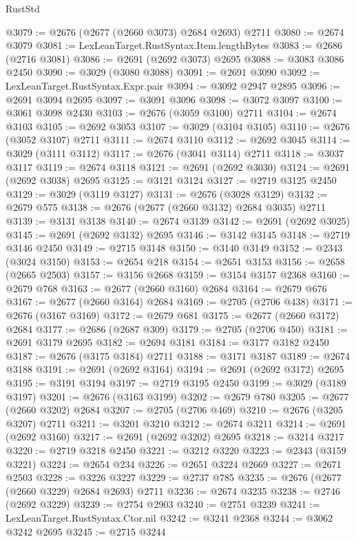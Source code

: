 \begin{lexlean}{RustStd}
\begin{coremodule}
@3079 := @2676 (@2677 (@2660 @3073) @2684 @2693) @2711
@3080 := @2674 @3079
@3081 := LexLeanTarget.RustSyntax.Item.lengthBytes
@3083 := @2686 (@2716 @3081)
@3086 := @2691 (@2692 @3073) @2695
@3088 := @3083 @3086 @2450
@3090 := @3029 (@3080 @3088)
@3091 := @2691 @3090
@3092 := LexLeanTarget.RustSyntax.Expr.pair
@3094 := @3092 @2947 @2895
@3096 := @2691 @3094 @2695
@3097 := @3091 @3096
@3098 := @3072 @3097
@3100 := @3061 @3098 @2430
@3103 := @2676 (@3059 @3100) @2711
@3104 := @2674 @3103
@3105 := @2692 @3053
@3107 := @3029 (@3104 @3105)
@3110 := @2676 (@3052 @3107) @2711
@3111 := @2674 @3110
@3112 := @2692 @3045
@3114 := @3029 (@3111 @3112)
@3117 := @2676 (@3041 @3114) @2711
@3118 := @3037 @3117
@3119 := @2674 @3118
@3121 := @2691 (@2692 @3030)
@3124 := @2691 (@2692 @3038) @2695
@3125 := @3121 @3124
@3127 := @2719 @3125 @2450
@3129 := @3029 (@3119 @3127)
@3131 := @2676 (@3028 @3129)
@3132 := @2679 @575
@3138 := @2676 (@2677 (@2660 @3132) @2684 @3035) @2711
@3139 := @3131 @3138
@3140 := @2674 @3139
@3142 := @2691 (@2692 @3025)
@3145 := @2691 (@2692 @3132) @2695
@3146 := @3142 @3145
@3148 := @2719 @3146 @2450
@3149 := @2715 @3148
@3150 := @3140 @3149
@3152 := @2343 (@3024 @3150)
@3153 := @2654 @218
@3154 := @2651 @3153
@3156 := @2658 (@2665 @2503)
@3157 := @3156 @2668
@3159 := @3154 @3157 @2368
@3160 := @2679 @768
@3163 := @2677 (@2660 @3160) @2684
@3164 := @2679 @676
@3167 := @2677 (@2660 @3164) @2684
@3169 := @2705 (@2706 @438)
@3171 := @2676 (@3167 @3169)
@3172 := @2679 @681
@3175 := @2677 (@2660 @3172) @2684
@3177 := @2686 (@2687 @309)
@3179 := @2705 (@2706 @450)
@3181 := @2691 @3179 @2695
@3182 := @2694 @3181
@3184 := @3177 @3182 @2450
@3187 := @2676 (@3175 @3184) @2711
@3188 := @3171 @3187
@3189 := @2674 @3188
@3191 := @2691 (@2692 @3164)
@3194 := @2691 (@2692 @3172) @2695
@3195 := @3191 @3194
@3197 := @2719 @3195 @2450
@3199 := @3029 (@3189 @3197)
@3201 := @2676 (@3163 @3199)
@3202 := @2679 @780
@3205 := @2677 (@2660 @3202) @2684
@3207 := @2705 (@2706 @469)
@3210 := @2676 (@3205 @3207) @2711
@3211 := @3201 @3210
@3212 := @2674 @3211
@3214 := @2691 (@2692 @3160)
@3217 := @2691 (@2692 @3202) @2695
@3218 := @3214 @3217
@3220 := @2719 @3218 @2450
@3221 := @3212 @3220
@3223 := @2343 (@3159 @3221)
@3224 := @2654 @234
@3226 := @2651 @3224 @2669
@3227 := @2671 @2503
@3228 := @3226 @3227
@3229 := @2737 @785
@3235 := @2676 (@2677 (@2660 @3229) @2684 @2693) @2711
@3236 := @2674 @3235
@3238 := @2746 (@2692 @3229)
@3239 := @2754 @2903
@3240 := @2751 @3239
@3241 := LexLeanTarget.RustSyntax.Ctor.nil
@3242 := @3241 @2368
@3244 := @3062 @3242 @2695
@3245 := @2715 @3244

\end{coremodule}
\end{lexlean}
